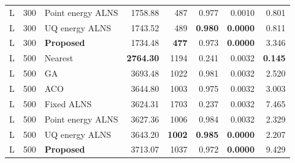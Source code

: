 \begin{longtable}{@{}rrlrrrrr@{}}
L & 300 & Point energy ALNS & 1758.88 & 487 & 0.977 & 0.0010 & 0.801 \\

L & 300 & UQ energy ALNS & 1743.52 & 489 & \textbf{0.980} & \textbf{0.0000} & 0.811 \\
\rowcolor{gray!10}
L & 300 & \textbf{Proposed} & 1734.48 & \textbf{477} & 0.973 & \textbf{0.0000} & 3.346 \\
\addlinespace[2pt]

L & 500 & Nearest & \textbf{2764.30} & 1194 & 0.241 & 0.0032 & \textbf{0.145} \\

L & 500 & GA & 3693.48 & 1022 & 0.981 & 0.0032 & 2.520 \\

L & 500 & ACO & 3644.80 & 1003 & 0.975 & 0.0032 & 3.003 \\

L & 500 & Fixed ALNS & 3624.31 & 1703 & 0.237 & 0.0032 & 7.465 \\

L & 500 & Point energy ALNS & 3627.36 & 1006 & 0.984 & 0.0032 & 2.329 \\

L & 500 & UQ energy ALNS & 3643.20 & \textbf{1002} & \textbf{0.985} & \textbf{0.0000} & 2.207 \\
\rowcolor{gray!10}
L & 500 & \textbf{Proposed} & 3713.07 & 1037 & 0.972 & \textbf{0.0000} & 9.429 \\
\bottomrule
\end{longtable}
\endgroup

